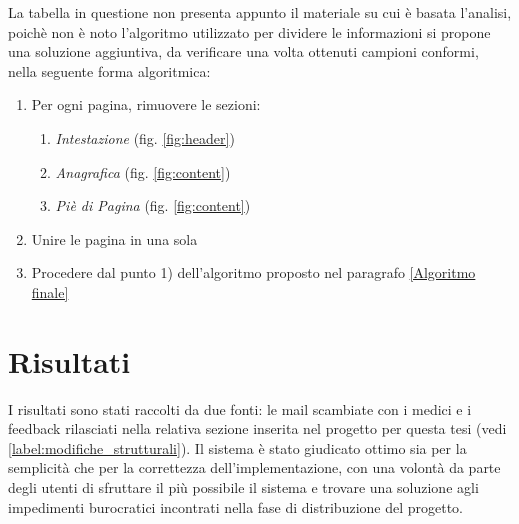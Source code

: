 La tabella in questione non presenta appunto il materiale su cui è basata l'analisi, poichè non è noto l'algoritmo utilizzato per dividere le informazioni si propone una soluzione aggiuntiva, da verificare una volta ottenuti campioni conformi, nella seguente forma algoritmica:
\begin{enumerate}
	\item Per ogni pagina, rimuovere le sezioni:
	\begin{enumerate}
		\item \textit{Intestazione} (fig. \ref{fig:header})
		\item \textit{Anagrafica} (fig. \ref{fig:content})	
		\item \textit{Piè di Pagina} (fig. \ref{fig:content})
	\end{enumerate}	
	\item Unire le pagina in una sola
	\item Procedere dal punto 1) dell'algoritmo proposto nel paragrafo \ref{Algoritmo finale}
\end{enumerate}
\newpage
\section{Risultati}
I risultati sono stati raccolti da due fonti: le mail scambiate con i medici e i feedback rilasciati nella relativa sezione inserita nel progetto per questa tesi (vedi \ref{label:modifiche_strutturali}).
Il sistema è stato giudicato ottimo sia per la semplicità che per la correttezza dell'implementazione, con una volontà da parte degli utenti di sfruttare il più possibile il sistema e trovare una soluzione agli impedimenti burocratici incontrati nella fase di distribuzione del progetto.




